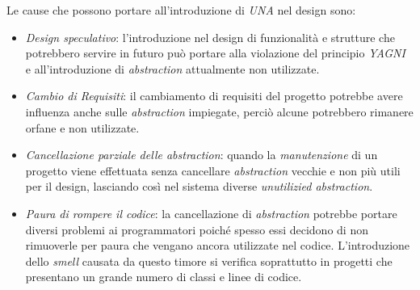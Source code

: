    Le cause che possono portare all'introduzione di \textit{UNA} nel design sono:
    \begin{itemize} %
        \item \textit{Design speculativo}: l'introduzione nel design di funzionalità e strutture che potrebbero servire in futuro può portare alla violazione del principio \textit{YAGNI} \cite{yagniFowler} e all'introduzione di \textit{abstraction} attualmente non utilizzate.
        
        \item \textit{Cambio di Requisiti}: il cambiamento di requisiti del progetto potrebbe avere influenza anche sulle \textit{abstraction} impiegate, perciò alcune potrebbero rimanere orfane e non utilizzate.
        
        \item \textit{Cancellazione parziale delle abstraction}: quando la \textit{manutenzione} di un progetto viene effettuata senza cancellare \textit{abstraction} vecchie e non più utili per il design, lasciando così nel sistema diverse \textit{unutilizied abstraction}.
        
        \item \textit{Paura di rompere il codice}: la cancellazione di \textit{abstraction} potrebbe portare diversi problemi ai programmatori poiché spesso essi decidono di non rimuoverle per paura che vengano ancora utilizzate nel codice. L'introduzione dello \textit{smell} causata da questo timore si verifica soprattutto in progetti che presentano un grande numero di classi e linee di codice.
    \end{itemize}
    
